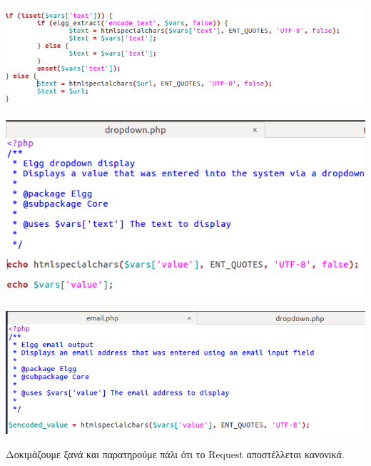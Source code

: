 \begin{center}
			\includegraphics[width=1\textwidth]{image/7.6.PNG}		
\end{center}

\begin{center}
			\includegraphics[width=1\textwidth]{image/7.7.PNG}		
\end{center}

\begin{center}
			\includegraphics[width=1\textwidth]{image/7.8.PNG}		
\end{center}

\noindent 
Δοκιμάζουμε ξανά και παρατηρούμε πάλι ότι το Request αποστέλλεται κανονικά.

